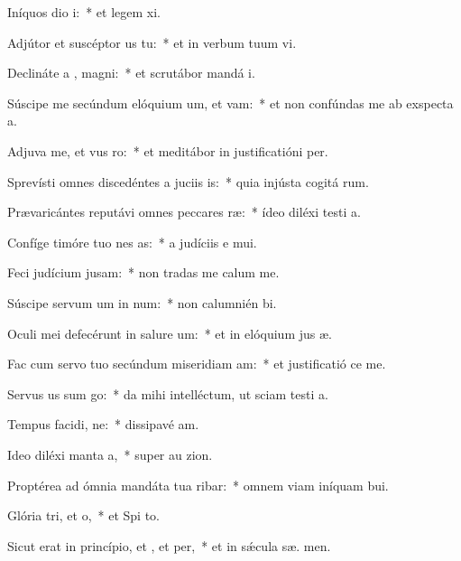 \item Iníquos dio i:~* et legem  xi.
\item Adjútor et suscéptor us  tu:~* et in verbum tuum vi.
\item Declináte a , magni:~* et scrutábor mandá  i.
\item Súscipe me secúndum elóquium um, et vam:~* et non confúndas me ab exspecta a.
\item Adjuva me, et vus ro:~* et meditábor in justificatióni  per.
\item Sprevísti omnes discedéntes a juciis is:~* quia injústa cogitá rum.
\item Prævaricántes reputávi omnes peccares ræ:~* ídeo diléxi testi a.
\item Confíge timóre tuo nes as:~* a judíciis e  mui.
\item Feci judícium  jusam:~* non tradas me calum me.
\item Súscipe servum um in num:~* non calumnién  bi.
\item Oculi mei defecérunt in salure um:~* et in elóquium jus æ.
\item Fac cum servo tuo secúndum miseridiam am:~* et justificatió  ce me.
\item Servus us sum go:~* da mihi intelléctum, ut sciam testi a.
\item Tempus facidi, ne:~* dissipavé  am.
\item Ideo diléxi manta a,~* super au  zion.
\item Proptérea ad ómnia mandáta tua ribar:~* omnem viam iníquam  bui.
\item Glória tri, et o,~* et Spi to.
\item Sicut erat in princípio, et , et per,~* et in sǽcula sæ. men.
